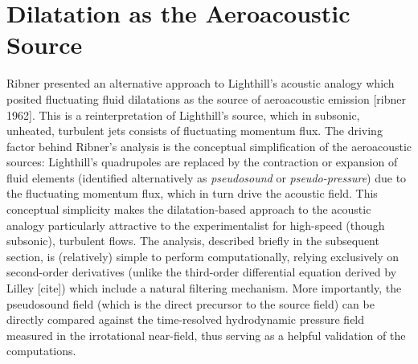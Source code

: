 \chapter{Dilatation as the Aeroacoustic Source}
Ribner presented an alternative approach to Lighthill's acoustic analogy which posited fluctuating fluid dilatations as the source of aeroacoustic emission [ribner 1962].
This is a reinterpretation of Lighthill's source, which in subsonic, unheated, turbulent jets consists of fluctuating momentum flux.
The driving factor behind Ribner's analysis is the conceptual simplification of the aeroacoustic sources: Lighthill's quadrupoles are replaced by the contraction or expansion of fluid elements (identified alternatively as \emph{pseudosound} or \emph{pseudo-pressure}) due to the fluctuating momentum flux, which in turn drive the acoustic field.
This conceptual simplicity makes the dilatation-based approach to the acoustic analogy particularly attractive to the experimentalist for high-speed (though subsonic), turbulent flows.
The analysis, described briefly in the subsequent section, is (relatively) simple to perform computationally, relying exclusively on second-order derivatives (unlike the third-order differential equation derived by Lilley [cite]) which include a natural filtering mechanism.
More importantly, the pseudosound field (which is the direct precursor to the source field) can be directly compared against the time-resolved hydrodynamic pressure field measured in the irrotational near-field, thus serving as a helpful validation of the computations.

